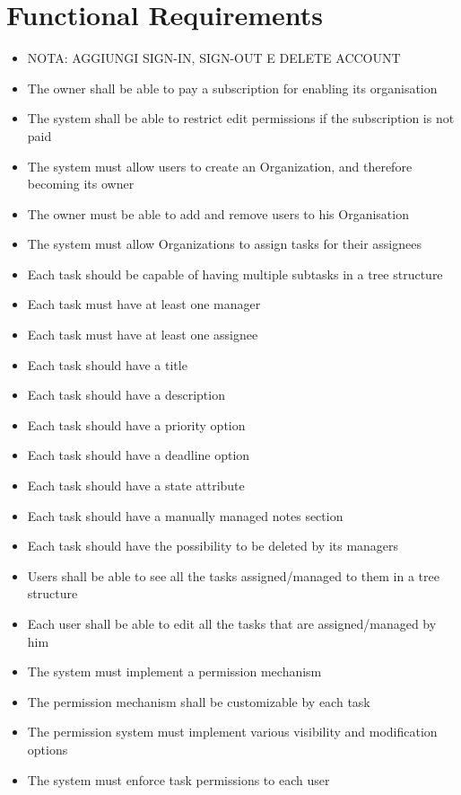 \documentclass{article}
\begin{document}
\section{Functional Requirements}
\begin{itemize}
    \item NOTA: AGGIUNGI SIGN-IN, SIGN-OUT E DELETE ACCOUNT
    \item The owner shall be able to pay a subscription for enabling its organisation
    \item The system shall be able to restrict edit permissions if the subscription is not paid
    \item The system must allow users to create an Organization, and therefore becoming its owner
    \item The owner must be able to add and remove users to his Organisation
    \item The system must allow Organizations to assign tasks for their assignees
    \item Each task should be capable of having multiple subtasks in a tree structure
    \item Each task must have at least one manager
    \item Each task must have at least one assignee
    \item Each task should have a title
    \item Each task should have a description
    \item Each task should have a priority option
    \item Each task should have a deadline option
    \item Each task should have a state attribute
    \item Each task should have a manually managed notes section
    \item Each task should have the possibility to be deleted by its managers
    \item Users shall be able to see all the tasks assigned/managed to them in a tree structure
    \item Each user shall be able to edit all the tasks that are assigned/managed by him
    \item The system must implement a permission mechanism
    \item The permission mechanism shall be customizable by each task
    \item The permission system must implement various visibility and modification options
    \item The system must enforce task permissions to each user

\end{itemize}
\end{document}
